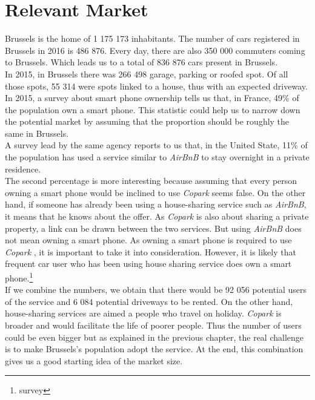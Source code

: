 \documentclass[12pt,a4paper,oneside]{book}
\newcommand{\bp}{\textit{Copark }}
\begin{document}
\section{Relevant Market}
\label{rmar}
Brussels is the home of 1 175 173\cite{ciafb} inhabitants. The number of cars registered in Brussels in 2016 is 486 876.\cite{mtvr} Every day, there are also 350 000 commuters coming to Brussels.\cite{bxcommu} Which leads us to a total of 836 876 cars present in Brussels.\\
In 2015, in Brussels there was 266 498 garage, parking or roofed spot. Of all those spots, 55 314 were spots linked to a house, thus with an expected driveway.\cite{atpb}\\

In 2015, a survey about smart phone ownership tells us that, in France, 49\% of the population own a smart phone.\cite{spown} This statistic could help us to narrow down the potential market by assuming that the proportion should be roughly the same in Brussels.\\
A survey lead by the same agency reports to us that, in the United State, 11\% of the population has used a service similar to \textit{AirBnB} to stay overnight in a private residence.\cite{airbnbuse}\\
The second percentage is more interesting because assuming that every person owning a smart phone would be inclined to use \bp seems false. On the other hand, if someone has already been using a house-sharing service such as \textit{AirBnB}, it means that he knows about the offer. As \bp is also about sharing a private property, a link can be drawn between the two services. But using \textit{AirBnB} does not mean owning a smart phone. As owning a smart phone is required to use \bp, it is important to take it into consideration. However, it is likely that frequent car user who has been using house sharing service does own a smart phone.\footnote{survey}\\

If we combine the numbers, we obtain that there would be 92 056 potential users of the service and 6 084 potential driveways to be rented. On the other hand, house-sharing services are aimed a people who travel on holiday. \bp is broader and would facilitate the life of poorer people. Thus the number of users could be even bigger but as explained in the previous chapter, the real challenge is to make Brussels's population adopt the service. At the end, this combination gives us a good starting idea of the market size.\\
\end{document}
